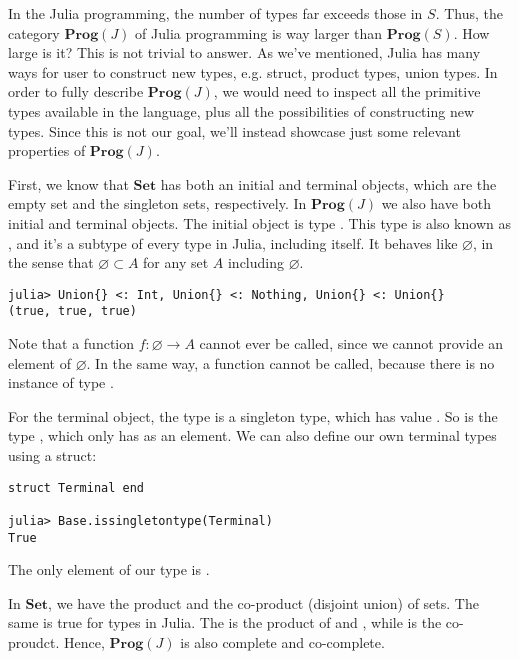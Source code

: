 In the Julia programming, the number of types far exceeds those in $S$.
Thus, the category $\mathbf{Prog}(J)$ of Julia programming
is way larger than $\mathbf{Prog}(S)$. How large is it?
This is not trivial to answer. As we've mentioned, Julia has many ways for user to construct new types,
e.g. struct, product types, union types. In order to fully describe
$\mathbf{Prog}(J)$, we would need to inspect all the primitive types available in the language,
plus all the possibilities of constructing new types.
Since this is not our goal, we'll instead showcase just some relevant properties of $\mathbf{Prog}(J)$.

First, we know that $\mathbf{Set}$ has both an initial and terminal objects, which
are the empty set and the singleton sets, respectively.
In $\mathbf{Prog}(J)$ we also have both initial and terminal objects.
The initial object is type .
This type is also known as , and it's a subtype of every type in Julia, including
itself. It behaves like $\varnothing$, in the sense that $\varnothing \subset A$
for any set $A$ including $\varnothing$.

\bigskip
\begin{lstlisting}[language=JuliaLocal, style=julia, texcl=true]
julia> Union{} <: Int, Union{} <: Nothing, Union{} <: Union{}
(true, true, true)
\end{lstlisting}

Note that a function $f:\varnothing \to A$ cannot ever be called, since we cannot
provide an element of $\varnothing$. In the same way, a function
 cannot be called, because there is no instance of type .

For the terminal object, the  type is a singleton type, which has value .
So is the type , which only has \pc{()} as an element.
We can also define our own terminal types using a struct:

\bigskip
\begin{lstlisting}[language=JuliaLocal, style=julia, texcl=true]
struct Terminal end

julia> Base.issingletontype(Terminal)
True
\end{lstlisting}
The only element of our type  is .

In $\mathbf{Set}$, we have the product and the co-product (disjoint union) of sets. The same is true
for types in Julia.
The  is the product of  and , while  is the co-proudct.
Hence, $\mathbf{Prog}(J)$ is also complete and co-complete.
